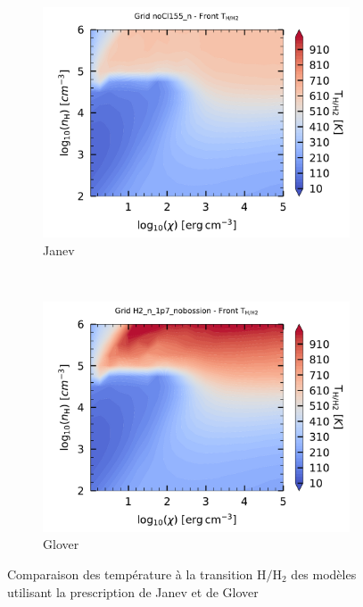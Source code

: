 \begin{figure}[!h]
    \centering
    \begin{subfigure}[t]{0.49\textwidth} %
        \centering \includegraphics[trim = {0 0 0 1cm },clip,width=1\textwidth]{figure/H2/grid_janev/HH2_T.pdf}
        \caption{Janev}
    \end{subfigure}
    ~ 
    \begin{subfigure}[t]{0.49\textwidth}
        \centering \includegraphics[trim = {0 0 0 1cm },clip,width=1\textwidth]{figure/H2/grid_glover/HH2_T.pdf}
        \caption{Glover}
    \end{subfigure}
    \caption{Comparaison des température à la transition $\mathrm{H}/\mathrm{H}_2$ des modèles utilisant la prescription de Janev et de Glover}
    \label{fig:H2:JanevGlover:THH2}
    

\end{figure}
